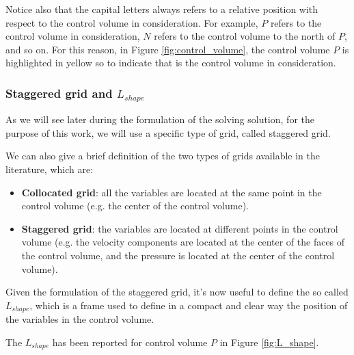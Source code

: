 Notice also that the capital letters always refers to a relative position with respect to the control volume in consideration.
For example, $P$ refers to the control volume in consideration, $N$ refers to the control volume to the north of $P$, and so on.
For this reason, in Figure \ref{fig:control_volume}, the control volume $P$ is highlighted in yellow so to indicate that is the control volume in consideration.


\subsubsection{Staggered grid and $L_{shape}$}

As we will see later during the formulation of the solving solution, for the purpose of this work, we will use a specific type of grid, called staggered grid.

We can also give a brief definition of the two types of grids available in the literature, which are:

\begin{itemize}
    \item \textbf{Collocated grid}: all the variables are located at the same point in the control volume (e.g. the center of the control volume).
    \item \textbf{Staggered grid}: the variables are located at different points in the control volume (e.g. the velocity components are located at the center of the faces of the control volume, and the pressure is located at the center of the control volume).
\end{itemize}

Given the formulation of the staggered grid, it's now useful to define the so called $L_{shape}$, which is a frame used to define in a compact and clear way the position of the variables in the control volume.

The $L_{shape}$ has been reported for control volume $P$ in Figure \ref{fig:L_shape}.

